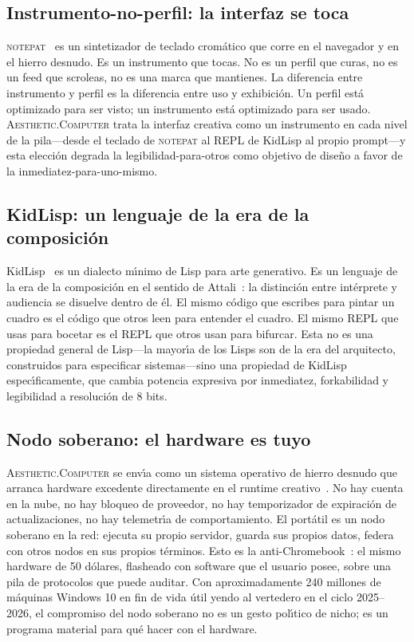 \documentclass[10pt,letterpaper,twocolumn]{article}
\newcommand{\ac}{\textsc{Aesthetic.Computer}}
\newcommand{\np}{\textsc{notepat}}
\begin{document}
\subsection{Instrumento-no-perfil: la interfaz se toca}

\np{}~\citep{scudder2026notepat} es un sintetizador de teclado crom\'{a}tico que corre en el navegador y en el hierro desnudo. Es un instrumento que tocas. No es un perfil que curas, no es un feed que scroleas, no es una marca que mantienes. La diferencia entre instrumento y perfil es la diferencia entre uso y exhibici\'{o}n. Un perfil est\'{a} optimizado para ser visto; un instrumento est\'{a} optimizado para ser usado. \ac{} trata la interfaz creativa como un instrumento en cada nivel de la pila---desde el teclado de \np{} al REPL de KidLisp al propio prompt---y esta elecci\'{o}n degrada la legibilidad-para-otros como objetivo de dise\~{n}o a favor de la inmediatez-para-uno-mismo.

\subsection{KidLisp: un lenguaje de la era de la composici\'{o}n}

KidLisp~\citep{scudder2026kidlisp} es un dialecto m\'{\i}nimo de Lisp para arte generativo. Es un lenguaje de la era de la composici\'{o}n en el sentido de Attali~\citep{attali1985noise}: la distinci\'{o}n entre int\'{e}rprete y audiencia se disuelve dentro de \'{e}l. El mismo c\'{o}digo que escribes para pintar un cuadro es el c\'{o}digo que otros leen para entender el cuadro. El mismo REPL que usas para bocetar es el REPL que otros usan para bifurcar. Esta no es una propiedad general de Lisp---la mayor\'{\i}a de los Lisps son de la era del arquitecto, construidos para especificar sistemas---sino una propiedad de KidLisp espec\'{\i}ficamente, que cambia potencia expresiva por inmediatez, forkabilidad y legibilidad a resoluci\'{o}n de 8 bits.

\subsection{Nodo soberano: el hardware es tuyo}

\ac{} se env\'{\i}a como un sistema operativo de hierro desnudo que arranca hardware excedente directamente en el runtime creativo~\citep{scudder2026os, scudder2026identity}. No hay cuenta en la nube, no hay bloqueo de proveedor, no hay temporizador de expiraci\'{o}n de actualizaciones, no hay telemetr\'{\i}a de comportamiento. El port\'{a}til es un nodo soberano en la red: ejecuta su propio servidor, guarda sus propios datos, federa con otros nodos en sus propios t\'{e}rminos. Esto es la anti-Chromebook~\citep{scudder2026openschools}: el mismo hardware de 50 d\'{o}lares, flasheado con software que el usuario posee, sobre una pila de protocolos que puede auditar. Con aproximadamente 240 millones de m\'{a}quinas Windows 10 en fin de vida \'{u}til yendo al vertedero en el ciclo 2025--2026, el compromiso del nodo soberano no es un gesto pol\'{\i}tico de nicho; es un programa material para qu\'{e} hacer con el hardware.
\end{document}
